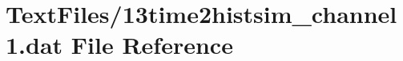 \hypertarget{13time2histsim__channel1_8dat}{}\section{Text\+Files/13time2histsim\+\_\+channel1.dat File Reference}
\label{13time2histsim__channel1_8dat}
